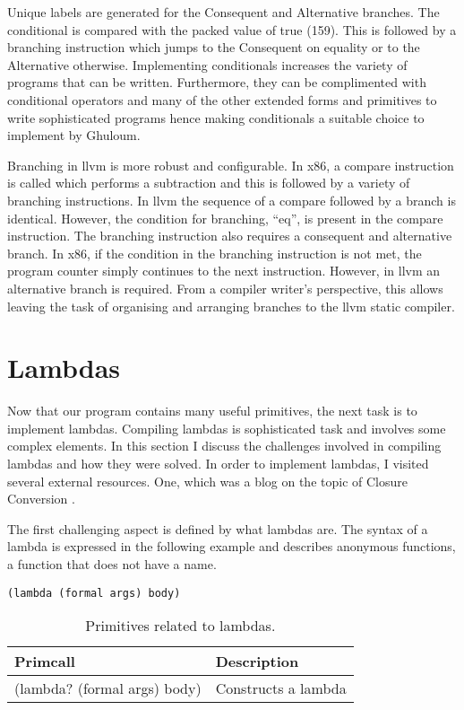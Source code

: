 \documentclass{article}
\begin{document}
Unique labels are generated for the Consequent and Alternative branches. The conditional is compared with the packed value of true (159). This is followed by a branching instruction which jumps to the Consequent on equality or to the Alternative otherwise. Implementing conditionals increases the variety of programs that can be written. Furthermore, they can be complimented with conditional operators and many of the other extended forms and primitives to write sophisticated programs hence making conditionals a suitable choice to implement by Ghuloum.

Branching in llvm is more robust and configurable. In x86, a compare instruction is called which performs a subtraction and this is followed by a variety of branching instructions. In llvm the sequence of a compare followed by a branch is identical. However, the condition for branching, ``eq'', is present in the compare instruction. The branching instruction also requires a consequent and alternative branch. In x86, if the condition in the branching instruction is not met, the program counter simply continues to the next instruction. However, in llvm an alternative branch is required. From a compiler writer's perspective, this allows leaving the task of organising and arranging branches to the llvm static compiler.

\section{Lambdas}

Now that our program contains many useful primitives, the next task is to implement lambdas. Compiling lambdas is sophisticated task and involves some complex elements. In this section I discuss the challenges involved in compiling lambdas and how they were solved. In order to implement lambdas, I visited several external resources. One, which was a blog on the topic of Closure Conversion \cite{closure-conversion}.

The first challenging aspect is defined by what lambdas are. The syntax of a lambda is expressed in the following example and describes anonymous functions, a function that does not have a name. 

\begin{verbatim}
(lambda (formal args) body)
\end{verbatim}

\begin{table}[ht]
  \centering
\begin{tabular}{ l l }
  \toprule
  Primcall & Description \\ \hline
  \midrule
  (lambda? (formal args) body) & Constructs a lambda \\
  \bottomrule
\end{tabular}
\caption{Primitives related to lambdas.} \label{tab:lambdas}
\end{table}
\end{document}
